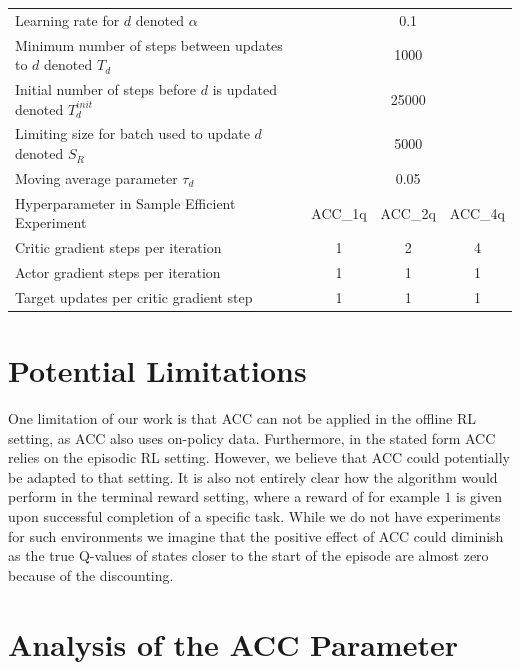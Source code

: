 \begin{table}[t]
\begin{center}
\begin{small}
\begin{sc}
\begin{tabular}{lccc}
Learning rate for $d$ denoted $\alpha$ & \multicolumn{3}{c}{0.1} \\
Minimum number of steps between updates to $d$ denoted $T_d$ & \multicolumn{3}{c}{1000} \\
Initial number of steps before $d$ is updated denoted $T_d^{init}$ & \multicolumn{3}{c}{25000} \\
Limiting size for batch used to update $d$ denoted $S_R$ & \multicolumn{3}{c}{5000} \\
Moving average parameter $\tau_d$ & \multicolumn{3}{c}{0.05} \\
\midrule
\midrule
Hyperparameter in Sample Efficient Experiment & ACC\_1q & ACC\_2q & ACC\_4q \\
\midrule
Critic gradient steps per iteration & 1 & 2 & 4 \\
Actor gradient steps per iteration & 1 & 1 & 1 \\
Target updates per critic gradient step & 1 & 1 & 1\\
\bottomrule
\end{tabular}
\end{sc}
\end{small}
\end{center}
\vskip -0.1in
\end{table}






\section{Potential Limitations}
One limitation of our work is that ACC can not be applied in the offline RL setting, as ACC also uses on-policy data.
Furthermore, in the stated form ACC relies on the episodic RL setting. However, we believe that ACC could potentially be adapted to that setting. 
It is also not entirely clear how the algorithm would perform in the terminal reward setting, where a reward of for example $1$ is given upon successful completion of a specific task. While we do not have experiments for such environments we imagine that the positive effect of ACC could diminish as the true Q-values of states closer to the start of the episode are almost zero because of the discounting. 




\section{Analysis of the ACC Parameter}
\label{app:analysis_acc_parameter}

